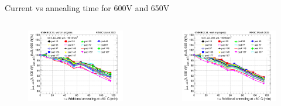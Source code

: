 \documentclass{beamer}
\begin{document}
\begin{frame}{Current vs annealing time for 600V and 650V}
  \begin{columns}
       \begin{figure}
           \includegraphics[width=1.0\textwidth]{plots/8in_198ch_2019_N4790_21_4E15_neg40degC_annealing_current_600.png}
       \end{figure}
       \begin{figure}
           \includegraphics[width=1.0\textwidth]{plots/8in_198ch_2019_N4790_21_4E15_neg40degC_annealing_current_650.png}
       \end{figure}
   \end{columns}
\end{frame}
\end{document}
